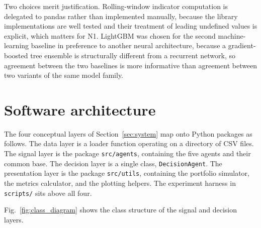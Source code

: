 Two choices merit justification. Rolling-window indicator computation is delegated to pandas rather than implemented manually, because the library implementations are well tested and their treatment of leading undefined values is explicit, which matters for N1. LightGBM was chosen for the second machine-learning baseline in preference to another neural architecture, because a gradient-boosted tree ensemble is structurally different from a recurrent network, so agreement between the two baselines is more informative than agreement between two variants of the same model family.

\section{Software architecture}\label{sec:software_architecture}

The four conceptual layers of Section~\ref{sec:system} map onto Python packages as follows. The data layer is a loader function operating on a directory of CSV files. The signal layer is the package \texttt{src/agents}, containing the five agents and their common base. The decision layer is a single class, \texttt{DecisionAgent}. The presentation layer is the package \texttt{src/utils}, containing the portfolio simulator, the metrics calculator, and the plotting helpers. The experiment harness in \texttt{scripts/} sits above all four.

Fig.~\ref{fig:class_diagram} shows the class structure of the signal and decision layers.

